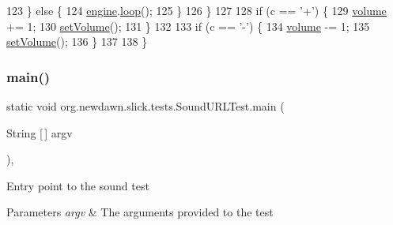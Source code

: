 \begin{DoxyCode}
123             \} \textcolor{keywordflow}{else} \{
124                 \mbox{\hyperlink{classorg_1_1newdawn_1_1slick_1_1tests_1_1_sound_u_r_l_test_a6a0807b2ab81a3514960bcc33ebea163}{engine}}.\mbox{\hyperlink{classorg_1_1newdawn_1_1slick_1_1_sound_a6642a989affb6089a72cd6ee5150a146}{loop}}();
125             \}
126         \}
127         
128         \textcolor{keywordflow}{if} (c == \textcolor{charliteral}{'+'}) \{
129             \mbox{\hyperlink{classorg_1_1newdawn_1_1slick_1_1tests_1_1_sound_u_r_l_test_ac1ddaaa87f02c72f643d03cf7a6014db}{volume}} += 1;
130             \mbox{\hyperlink{classorg_1_1newdawn_1_1slick_1_1tests_1_1_sound_u_r_l_test_aed79b291956c094f92082480bd818df7}{setVolume}}();
131         \}
132         
133         \textcolor{keywordflow}{if} (c == \textcolor{charliteral}{'-'}) \{
134             \mbox{\hyperlink{classorg_1_1newdawn_1_1slick_1_1tests_1_1_sound_u_r_l_test_ac1ddaaa87f02c72f643d03cf7a6014db}{volume}} -= 1;
135             \mbox{\hyperlink{classorg_1_1newdawn_1_1slick_1_1tests_1_1_sound_u_r_l_test_aed79b291956c094f92082480bd818df7}{setVolume}}();
136         \}
137 
138     \}
\end{DoxyCode}
\mbox{\label{classorg_1_1newdawn_1_1slick_1_1tests_1_1_sound_u_r_l_test_a576b6c1548dfe7a5885853f4cddc0086}} 
\subsubsection{\texorpdfstring{main()}{main()}}
{\footnotesize\ttfamily static void org.\+newdawn.\+slick.\+tests.\+Sound\+U\+R\+L\+Test.\+main (\begin{DoxyParamCaption}\item[{String \mbox{[}$\,$\mbox{]}}]{argv }\end{DoxyParamCaption})\hspace{0.3cm}{\ttfamily [inline]}, {\ttfamily [static]}}

Entry point to the sound test


\begin{DoxyParams}{Parameters}
{\em argv} & The arguments provided to the test \\
\hline
\end{DoxyParams}

